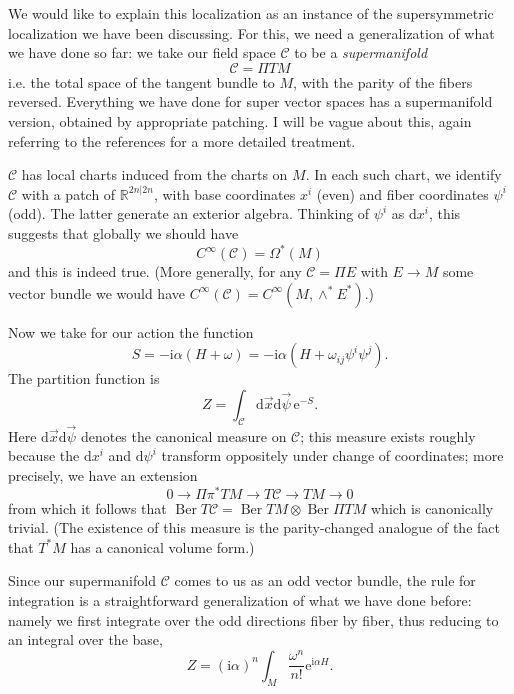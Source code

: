 \documentclass[12pt,letterpaper,reqno]{article}
\numberwithin{equation}{section}
\newcommand{\cC}{\ensuremath{\mathcal C}}
\newcommand{\R}{\ensuremath{\mathbb R}}
\newcommand{\I}{{\mathrm i}}
\newcommand{\e}{{\mathrm e}}
\newcommand{\de}{\mathrm{d}}
\newcommand{\ti}[1]{\textit{#1}}
\DeclareMathOperator{\Ber}{Ber}
\begin{document}
We would like to explain this localization as an instance
of the supersymmetric localization we have been discussing.
For this, we need a generalization of what we have done
so far: we take our field space $\cC$ to be a \ti{supermanifold}
\begin{equation}
 \cC = \Pi T M 
\end{equation}
i.e. the total space of the tangent bundle to $M$,
with the parity of the fibers reversed.
Everything we have done for super vector spaces has
a supermanifold version, obtained by appropriate patching.
I will be vague about this, again referring to the references
\cite{Deligne1999b,etingof,Witten2012,Zakharevich2017} for a
more detailed treatment.

$\cC$ has local charts induced from the charts on $M$.
In each such chart, we identify $\cC$ with a patch of 
$\R^{2n \vert 2n}$, with base coordinates $x^i$ (even)
and fiber coordinates $\psi^i$ (odd). The latter generate an
exterior algebra. Thinking of $\psi^i$ as $\de x^i$, this
suggests that globally we should have
\begin{equation}
  C^\infty(\cC) = \Omega^*(M)
\end{equation}
and this is indeed true.
(More generally, for any $\cC = \Pi E$ with $E \to M$ some vector
bundle we would have $C^\infty(\cC) = C^\infty(M, \wedge^* E^*)$.)

Now we take for our action the function
\begin{equation}
  S = -\I \alpha (H + \omega) = -\I \alpha (H + \omega_{ij} \psi^i \psi^j).
\end{equation}
The partition function is
\begin{equation}
  Z = \int_\cC \de \vec{x} \de \vec{\psi} \, \e^{-S}.
\end{equation}
Here $\de \vec{x} \de \vec{\psi}$ denotes the canonical measure
on $\cC$; this measure exists roughly because the
$\de x^i$ and $\de \psi^i$ transform oppositely under
change of coordinates; more precisely, we have an extension
\begin{equation}
  0 \to \Pi \pi^* TM \to T\cC \to TM \to 0
\end{equation}
from which it follows that $\Ber T\cC = \Ber TM \otimes \Ber \Pi TM$
which is canonically trivial. (The existence of this measure is
the parity-changed analogue of the fact that $T^* M$ has a canonical
volume form.)

Since our supermanifold $\cC$ comes to us as an odd vector bundle, the
rule for integration is a straightforward generalization of what we
have done before: namely we first integrate over the odd directions fiber
by fiber, thus reducing to an integral over the base,
\begin{equation} \label{eq:dh-integrated-over-fibers}
  Z = (\I \alpha)^n \int_M \frac{\omega^n}{n!} \e^{\I \alpha H}.
\end{equation}
\end{document}
